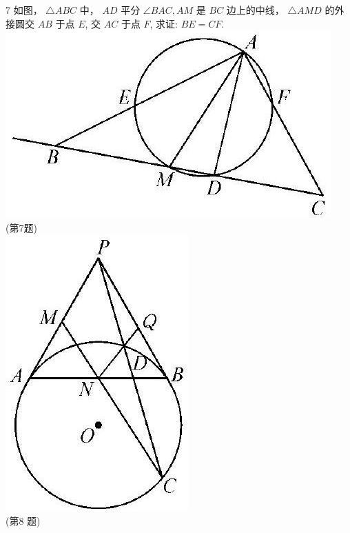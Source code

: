 \documentclass[10pt]{article}
\begin{document}
7 如图， $\triangle A B C$ 中， $A D$ 平分 $\angle B A C, A M$ 是 $B C$ 边上的中线， $\triangle A M D$ 的外接圆交 $A B$ 于点 $E$, 交 $A C$ 于点 $F$, 求证: $B E=C F$.\\
\includegraphics[max width=\textwidth, center]{2024_10_30_66b8e5e701da2093c133g-064(4)}\\
(第7题)\\
\includegraphics[max width=\textwidth, center]{2024_10_30_66b8e5e701da2093c133g-064}\\
(第8 题)
\end{document}
